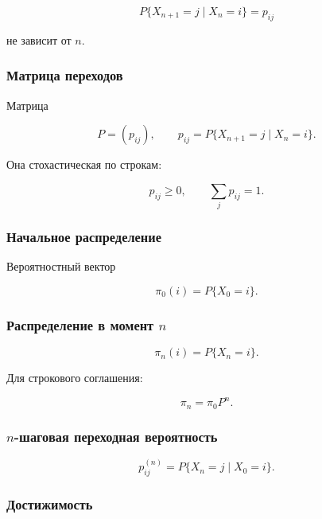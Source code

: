 \documentclass[
  11pt,
  a4paper,
]{article}
\begin{document}
\[
P\{X_{n+1}=j\mid X_n=i\}=p_{ij}
\]

не зависит от \(n\).

\subsubsection{Матрица
переходов}\label{ux43cux430ux442ux440ux438ux446ux430-ux43fux435ux440ux435ux445ux43eux434ux43eux432}

Матрица

\[
P=(p_{ij}),
\qquad
p_{ij}=P\{X_{n+1}=j\mid X_n=i\}.
\]

Она стохастическая по строкам:

\[
p_{ij}\ge0,
\qquad
\sum_jp_{ij}=1.
\]

\subsubsection{Начальное
распределение}\label{ux43dux430ux447ux430ux43bux44cux43dux43eux435-ux440ux430ux441ux43fux440ux435ux434ux435ux43bux435ux43dux438ux435}

Вероятностный вектор

\[
\pi_0(i)=P\{X_0=i\}.
\]

\subsubsection{\texorpdfstring{Распределение в момент
\(n\)}{Распределение в момент n}}\label{ux440ux430ux441ux43fux440ux435ux434ux435ux43bux435ux43dux438ux435-ux432-ux43cux43eux43cux435ux43dux442-n}

\[
\pi_n(i)=P\{X_n=i\}.
\]

Для строкового соглашения:

\[
\pi_n=\pi_0P^n.
\]

\subsubsection{\texorpdfstring{\(n\)-шаговая переходная
вероятность}{n-шаговая переходная вероятность}}\label{n-ux448ux430ux433ux43eux432ux430ux44f-ux43fux435ux440ux435ux445ux43eux434ux43dux430ux44f-ux432ux435ux440ux43eux44fux442ux43dux43eux441ux442ux44c}

\[
p_{ij}^{(n)}=P\{X_n=j\mid X_0=i\}.
\]

\subsubsection{Достижимость}\label{ux434ux43eux441ux442ux438ux436ux438ux43cux43eux441ux442ux44c}
\end{document}
